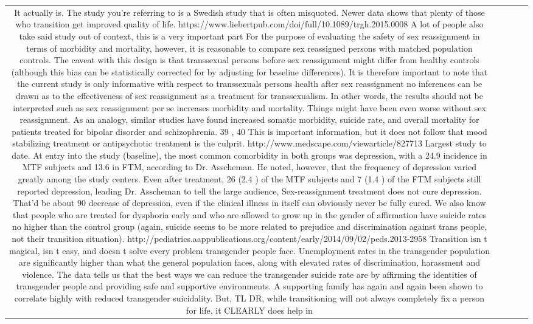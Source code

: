 \documentclass[11pt]{article}
\newlength\mylength
\begin{document}
\begin{center}
\begin{longtable}{|C{.40\mylength}|C{.30\mylength}|C{.15\mylength}|C{.15\mylength}|C{.15\mylength}|}
  It actually is.  The study you're referring to is a Swedish study that is often misquoted. Newer data shows that plenty of those who transition get improved quality of life.  https://www.liebertpub.com/doi/full/10.1089/trgh.2015.0008  A lot of people also take said study out of context, this is a very important part   For the purpose of evaluating the safety of sex reassignment in terms of morbidity and mortality, however, it is reasonable to compare sex reassigned persons with matched population controls. The caveat with this design is that transsexual persons before sex reassignment might differ from healthy controls (although this bias can be statistically corrected for by adjusting for baseline differences). It is therefore important to note that the current study is only informative with respect to transsexuals persons health after sex reassignment  no inferences can be drawn as to the effectiveness of sex reassignment as a treatment for transsexualism. In other words, the results should not be interpreted such as sex reassignment per se increases morbidity and mortality. Things might have been even worse without sex reassignment. As an analogy, similar studies have found increased somatic morbidity, suicide rate, and overall mortality for patients treated for bipolar disorder and schizophrenia. 39 ,  40  This is important information, but it does not follow that mood stabilizing treatment or antipsychotic treatment is the culprit.  http://www.medscape.com/viewarticle/827713  Largest study to date.  At entry into the study (baseline), the most common comorbidity in both groups was depression, with a 24.9  incidence in MTF subjects and 13.6  in FTM, according to Dr. Asscheman. He noted, however, that the frequency of depression varied greatly among the study centers. Even after treatment, 26 (2.4 ) of the MTF subjects and 7 (1.4 ) of the FTM subjects still reported depression, leading Dr. Asscheman to tell the large audience,  Sex-reassignment treatment does not cure depression.   That'd be about 90  decrease of depression, even if the clinical illness in itself can obviously never be fully cured.  We also know that people who are treated for dysphoria early and who are allowed to grow up in the gender of affirmation have suicide rates no higher than the control group (again, suicide seems to be more related to prejudice and discrimination against trans people, not their transition situation).  http://pediatrics.aappublications.org/content/early/2014/09/02/peds.2013-2958  Transition isn t magical, isn t easy, and doesn t solve every problem transgender people face. Unemployment rates in the transgender population are significantly higher than what the general population faces, along with elevated rates of discrimination, harassment and violence. The data tells us that the best ways we can reduce the transgender suicide rate are by affirming the identities of transgender people and providing safe and supportive environments. A supporting family has again and again been shown to correlate highly with reduced transgender suicidality.  But, TL DR, while transitioning will not always completely fix a person for life, it CLEARLY does help in 
\end{longtable}
\end{center}
\end{document}
